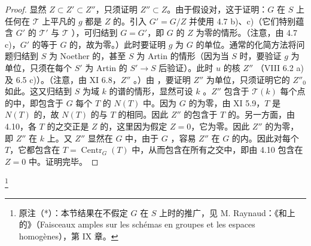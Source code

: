 \begin{proof}
显然 $Z\subset Z'\subset Z''$，只须证明 $Z''\subset Z$。由于假设对，这于证明：$G$ 在 $S$ 上任何在 $\mathcal T$ 上平凡的 $g$ 都是 $Z$ 的。引入 $G'=G/Z$ 并使用 4.7 b)、c)（它们特别蕴含 $G'$ 的 $\mathcal T'$ 与 $\mathcal T$ ），可归结到 $G=G'$，即 $G$ 的 $Z$ 为零的情形。（注意，由 4.7 c)，$G'$ 的等于 $G$ 的，故为零。）此时要证明 $g$ 为 $G$ 的单位。通常的化简方法将问题归结到 $S$ 为 Noether 的，甚至 $S$ 为 Artin 的情形（因为当 $S$  时，要验证 $g$ 为单位，只须在每个 $S'$ 为 Artin 的 $S'\to S$ 后验证）。此时 $u$ 的核 $Z''$ （VIII 6.2 a) 及 6.5 c)）。（注意，由 XI 6.8，$Z''$ 。）由 ，要证明 $Z''$ 为单位，只须证明它的 $Z''_0$ 如此。这又归结到 $S$ 为域 $k$ 的谱的情形，显然可设 $k$ 。$Z''$ 包含于 $\mathcal T(k)$ 每个点的中，即包含于 $G$ 每个 $T$ 的 $N(T)$ 中。因为 $G$ 的为零，由 XI 5.9，$T$ 是 $N(T)$ 的，故 $N(T)$ 的与 $T$ 的相同。因此 $Z''$ 的包含于 $T$ 的。另一方面，由 4.10，各 $T$ 的之交正是 $Z$ 的，这里因为假定 $Z=0$，它为零。因此 $Z''$ 的为零，即 $Z''$ 在 $k$ 上。又 $Z''$ 显然在 $G$ 中，由于 $G$ ，容易 $Z''$ 在 $G$ 的内。因此对每个 $T$，它都包含在 $T=\operatorname{Centr}_G(T)$ 中，从而包含在所有之交中，即由 4.10 包含在 $Z=0$ 中。证明完毕。
\end{proof}
\footnote{原注（*）：本节结果在不假定 $G$ 在 $S$ 上时的推广，见 M. Raynaud：《和上的》（Faisceaux amples sur les schémas en groupes et les espaces homogènes），第 IX 章。}
